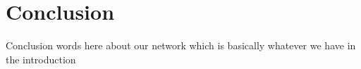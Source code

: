 \documentclass[twocolumn,11pt,english]{article}
\begin{document}
\section{Conclusion}
Conclusion words here about our network which is basically whatever we have in the introduction

\newpage



\end{document}
